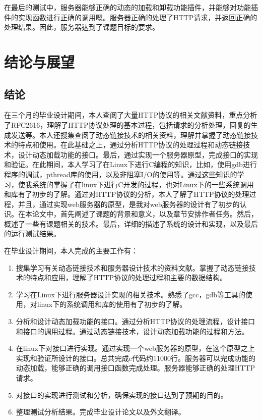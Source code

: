 \documentclass[twoside, xetex]{report}
\begin{document}
	在最后的测试中，服务器能够正确的动态的加载和卸载功能插件，并能够对功能插件的实现函数进行正确的调用嗯。服务器正确的处理了HTTP请求，并返回正确的处理结果。因此，服务器达到了课题目标的要求。
	
\chapter{结论与展望}
\section{结论}
	在三个月的毕业设计期间，本人查阅了大量HTTP协议的相关文献资料，重点分析了RFC2616，理解了HTTP协议处理的基本过程，包括请求的分析处理，回复的生成发送等。本人还搜集查阅了动态链接技术的相关资料，理解并掌握了动态链接技术的特点和使用。在此基础之上，通过分析HTTP协议的处理过程和动态链接技术，设计动态加载功能的接口。最后，通过实现一个服务器原型，完成接口的实现和验证。在此期间，本人学习了在Linux下进行C编程的知识，比如，使用gdb进行程序的调试，pthread库的使用，以及非阻塞I/O的使用等。通过这些知识的学习，使我系统的掌握了在linux下进行C开发的过程，也对Linux下的一些系统调用和库有了初步的了解。通过对HTTP协议的分析，本人了解了HTTP协议的处理过程，并且，通过实现web服务器的原型，是我对web服务器的设计有了初步的认识。在本论文中，首先阐述了课题的背景和意义，以及章节安排作者任务。然后，概述了一些有课题相关的技术。最后，详细的描述了系统的设计和实现，以及最后的运行测试结果。
	
	在毕业设计期间，本人完成的主要工作有：
	\begin{enumerate}
		\item 搜集学习有关动态链接技术和服务器设计技术的资料文献。掌握了动态链接技术的特点和应用，理解了HTTP协议的处理过程和主要的数据结构。
		\item 学习在Linux下进行服务器设计实现的相关技术。熟悉了gcc，gdb等工具的使用，对linux下的系统调用和库的使用有了初步的了解。
		\item 分析和设计动态加载功能的接口。通过分析HTTP协议的处理流程，设计接口和接口的调用过程。通过动态链接技术，设计动态加载功能的过程和方法。
		\item 在linux下对接口进行实现。通过实现一个web服务器的原型，在这个原型之上实现和验证所设计的接口。总共完成c代码约11000行。服务器可以完成功能的动态加载，能够正确的调用接口函数完成处理。服务器能够正确的处理HTTP请求。
		\item 对接口的实现进行测试和分析，确保实现的接口达到了预期的目的。
		\item 整理测试分析结果。完成毕业设计论文以及外文翻译。
	\end{enumerate}
	
\end{document}
